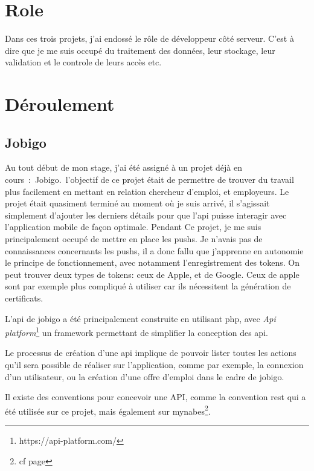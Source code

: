 \documentclass[../rapport.tex]{subfiles}
\begin{document}
    \section{Role}
        Dans ces trois projets, j'ai endossé le rôle de développeur côté
        serveur. C'est à dire que je me suis occupé du traitement des données,
        leur stockage, leur validation et le controle de leurs accès etc.
    \section{Déroulement}
        \subsection{Jobigo}\label{subsec:jobigo}
        Au tout début de mon stage, j'ai été assigné à un projet déjà en cours~:~Jobigo.\
        l'objectif de
        ce projet était de permettre de trouver du travail plus facilement
        en mettant en relation chercheur d'emploi, et employeurs.
        Le projet était quasiment terminé au moment où je suis arrivé, il s'agissait simplement d'ajouter
        les derniers détails pour que l'\gls{api} puisse interagir avec l'application mobile
        de façon optimale.
        Pendant Ce projet, je me suis principalement occupé de mettre en place les \glspl{push}.
        Je n'avais pas de connaissances concernants les \glspl{push}, il a donc fallu que 
        j'apprenne en autonomie le principe de fonctionnement, avec notamment l'enregistrement 
        des \glspl{token}. On peut trouver deux types de \glspl{token}: ceux de Apple, et de Google.
        Ceux de apple sont par exemple plus compliqué à utiliser car ils nécessitent la génération 
        de certificats.

            L'api de jobigo a été principalement construite en utilisant php, avec \textit{Api platform}\footnote{https://api-platform.com/} un \gls{framework} permettant de simplifier la conception des \gls{api}.

        Le processus de création d'une \gls{api} implique de pouvoir lister toutes les actions 
        qu'il sera possible de réaliser sur l'application, comme par exemple, la connexion d'un utilisateur, 
        ou la création d'une offre d'emploi dans le cadre de jobigo.

        Il existe des conventions pour concevoir une API, comme la convention \gls{rest} qui a été utilisée
        sur ce projet, mais également sur mynabes\footnote{cf page \pageref{subsec:mynabes}}.
\end{document}
